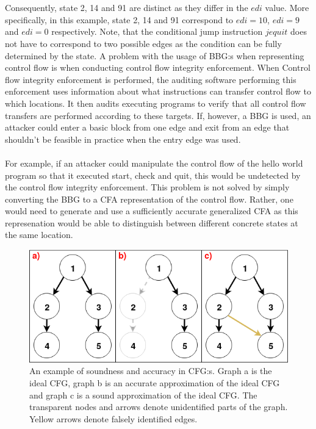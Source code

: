\documentclass{kththesis}
\begin{document}
\\ \\
Consequently, state 2, 14 and 91 are distinct as they differ in the $edi$ value. More specifically, in this example, state 2, 14 and 91 correspond to $edi=10$, $edi=9$ and $edi=0$ respectively. Note, that the conditional jump instruction $je quit$ does not have to correspond to two possible edges as the condition can be fully determined by the state.
\clearpage
\noindent
A problem with the usage of BBG:s when representing control flow is when conducting control flow integrity enforcement\cite{CFIEnforcement}. When Control flow integrity enforcement is performed, the auditing software performing this enforcement uses information about what instructions can transfer control flow to which locations. It then audits executing programs to verify that all control flow transfers are performed according to these targets. If, however, a BBG is used, an attacker could enter a basic block from one edge and exit from an edge that shouldn't be feasible in practice when the entry edge was used. 
\\ \\
For example, if an attacker could manipulate the control flow of the hello world program so that it executed start, check and quit, this would be undetected by the control flow integrity enforcement. This problem is not solved by simply converting the BBG to a CFA representation of the control flow. Rather, one would need to generate and use a sufficiently accurate generalized CFA as this represenation would be able to distinguish between different concrete states at the same location.
\begin{figure}[th]
    \centering
    \includegraphics[scale=0.6]{Images/SoundAccurateGraph.png}
    \caption[An example of soundness and accuracy in CFG:s.]{An example of soundness and accuracy in CFG:s. Graph a is the ideal CFG, graph b is an accurate approximation of the ideal CFG and graph c is a sound approximation of the ideal CFG. The transparent nodes and arrows denote unidentified parts of the graph. Yellow arrows denote falsely identified edges.}
    \label{fig:SoundAccurateGraph}
\end{figure}
\end{document}
